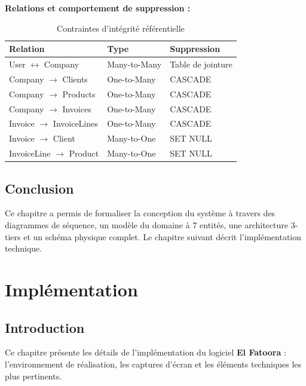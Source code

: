 \documentclass[a4paper,12pt]{report}
\newcommand{\elfattoora}{\textbf{El Fatoora}}
\begin{document}
\textbf{Relations et comportement de suppression :}

\begin{table}[htbp]
\centering
\caption{Contraintes d'intégrité référentielle}
\begin{tabular}{|l|l|l|}
\hline
\textbf{Relation} & \textbf{Type} & \textbf{Suppression} \\
\hline
User $\leftrightarrow$ Company & Many-to-Many & Table de jointure \\
\hline
Company $\rightarrow$ Clients & One-to-Many & CASCADE \\
\hline
Company $\rightarrow$ Products & One-to-Many & CASCADE \\
\hline
Company $\rightarrow$ Invoices & One-to-Many & CASCADE \\
\hline
Invoice $\rightarrow$ InvoiceLines & One-to-Many & CASCADE \\
\hline
Invoice $\rightarrow$ Client & Many-to-One & SET NULL \\
\hline
InvoiceLine $\rightarrow$ Product & Many-to-One & SET NULL \\
\hline
\end{tabular}
\end{table}

\section{Conclusion}

Ce chapitre a permis de formaliser la conception du système à travers des diagrammes de séquence, un modèle du domaine à 7 entités, une architecture 3-tiers et un schéma physique complet. Le chapitre suivant décrit l'implémentation technique.


\chapter{Implémentation}

\section{Introduction}

Ce chapitre présente les détails de l'implémentation du logiciel \elfattoora{} : l'environnement de réalisation, les captures d'écran et les éléments techniques les plus pertinents.
\end{document}
